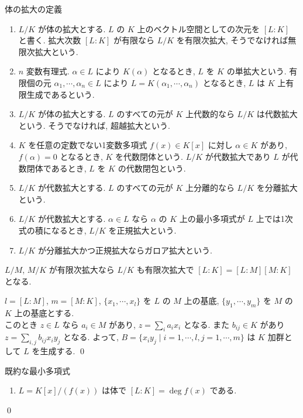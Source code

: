 \documentclass[uplatex,dvipdfmx,a4paper,11pt]{jlreq}
\makeatletter
\theoremstyle{definition}
\renewenvironment{proof}[1][\proofname]{\par
  \normalfont
  \topsep6\p@\@plus6\p@ \trivlist
  \item[\hskip\labelsep{\bfseries #1}\@addpunct{\bfseries}]\ignorespaces\quad\par
}{%
  \qed\endtrivlist\@endpefalse
}
\renewcommand\proofname{証明}
\makeatother
\begin{document}
\begin{definition}
  体の拡大の定義
  \begin{enumerate}
    \item $L/K$ が体の拡大とする. $L$ の $K$ 上のベクトル空間としての次元を $[L:K]$ と書く. 拡大次数 $[L:K]$ が有限なら $L/K$ を有限次拡大, そうでなければ無限次拡大という.
    \item $n$ 変数有理式. $\alpha\in L$ により $K(\alpha)$ となるとき, $L$ を $K$ の単拡大という. 有限個の元 $\alpha_1,\cdots,\alpha_n\in L$ により $L = K(\alpha_1,\cdots,\alpha_n)$ となるとき, $L$ は $K$ 上有限生成であるという.
    \item $L/K$ が体の拡大とする. $L$ のすべての元が $K$ 上代数的なら $L/K$ は代数拡大という. そうでなければ, 超越拡大という.
    \item $K$ を任意の定数でない1変数多項式 $f(x)\in K[x]$ に対し $\alpha\in K$ があり, $f(\alpha) = 0$ となるとき, $K$ を代数閉体という. $L/K$ が代数拡大であり $L$ が代数閉体であるとき, $L$ を $K$ の代数閉包という.
    \item $L/K$ が代数拡大とする. $L$ のすべての元が $K$ 上分離的なら $L/K$ を分離拡大という.
    \item $L/K$ が代数拡大とする. $\alpha\in L$ なら $\alpha$ の $K$ 上の最小多項式が $L$ 上では1次式の積になるとき, $L/K$ を正規拡大という.
    \item $L/K$ が分離拡大かつ正規拡大ならガロア拡大という.
  \end{enumerate}
\end{definition}


\begin{proposition}
  $L/M$, $M/K$ が有限次拡大なら $L/K$ も有限次拡大で $[L:K] = [L:M][M:K]$ となる.
\end{proposition}
\begin{proof}
  $l = [L:M]$, $m = [M:K]$, $\lbrace x_1,\cdots,x_l \rbrace$ を $L$ の $M$ 上の基底, $\lbrace y_1,\cdots,y_m \rbrace$ を $M$ の $K$ 上の基底とする. \\
  このとき $z\in L$ なら $a_i\in M$ があり, $z = \sum_ia_ix_i$ となる. また $b_{ij}\in K$ があり $z = \sum_{i,j}b_{ij}x_iy_j$ となる. よって, $B=\lbrace x_iy_j\mid i=1,\cdots,l, j = 1,\cdots,m\rbrace$ は $K$ 加群として $L$ を生成する.
\end{proof}

\begin{proposition}
  既約な最小多項式
  \begin{enumerate}
    \item $L = K[x]/(f(x))$ は体で $[L:K] = \deg f(x)$ である.
  \end{enumerate}
\end{proposition}
\begin{proof}
\end{proof}
\end{document}
